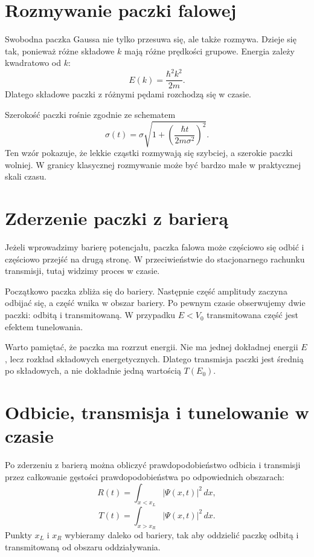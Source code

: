\section{Rozmywanie paczki falowej}

Swobodna paczka Gaussa nie tylko przesuwa się, ale także rozmywa. Dzieje się tak, ponieważ różne składowe \(k\) mają różne prędkości grupowe. Energia zależy kwadratowo od \(k\):
\begin{equation}
    E(k)=\frac{\hbar^2k^2}{2m}.
\end{equation}
Dlatego składowe paczki z różnymi pędami rozchodzą się w czasie.

Szerokość paczki rośnie zgodnie ze schematem
\begin{equation}
    \sigma(t)=\sigma\sqrt{1+\left(\frac{\hbar t}{2m\sigma^2}\right)^2}.
\end{equation}
Ten wzór pokazuje, że lekkie cząstki rozmywają się szybciej, a szerokie paczki wolniej. W granicy klasycznej rozmywanie może być bardzo małe w praktycznej skali czasu.

\section{Zderzenie paczki z barierą}

Jeżeli wprowadzimy barierę potencjału, paczka falowa może częściowo się odbić i częściowo przejść na drugą stronę. W przeciwieństwie do stacjonarnego rachunku transmisji, tutaj widzimy proces w czasie.

Początkowo paczka zbliża się do bariery. Następnie część amplitudy zaczyna odbijać się, a część wnika w obszar bariery. Po pewnym czasie obserwujemy dwie paczki: odbitą i transmitowaną. W przypadku \(E<V_0\) transmitowana część jest efektem tunelowania.

Warto pamiętać, że paczka ma rozrzut energii. Nie ma jednej dokładnej energii \(E\), lecz rozkład składowych energetycznych. Dlatego transmisja paczki jest średnią po składowych, a nie dokładnie jedną wartością \(T(E_0)\).

\section{Odbicie, transmisja i tunelowanie w czasie}

Po zderzeniu z barierą można obliczyć prawdopodobieństwo odbicia i transmisji przez całkowanie gęstości prawdopodobieństwa po odpowiednich obszarach:
\begin{equation}
    R(t)=\int_{x<x_L}|\Psi(x,t)|^2\,dx,
\end{equation}
\begin{equation}
    T(t)=\int_{x>x_R}|\Psi(x,t)|^2\,dx.
\end{equation}
Punkty \(x_L\) i \(x_R\) wybieramy daleko od bariery, tak aby oddzielić paczkę odbitą i transmitowaną od obszaru oddziaływania.

